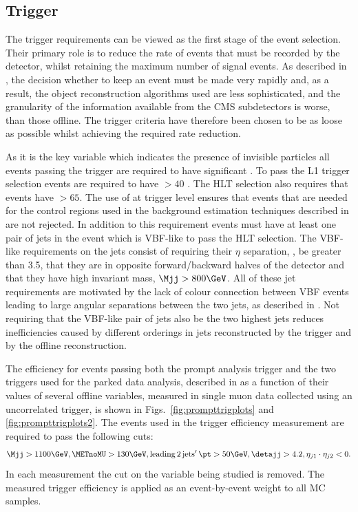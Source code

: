 \subsection{Trigger}
\label{sec:prompttrig}
The trigger requirements can be viewed as the first stage of the event selection. Their primary role is to reduce the rate of events that must be recorded by the detector, whilst retaining the maximum number of signal events. As described in , the decision whether to keep an event must be made very rapidly and, as a result, the object reconstruction algorithms used are less sophisticated, and the granularity of the information available from the CMS subdetectors is worse, than those offline. The trigger criteria have therefore been chosen to be as loose as possible whilst achieving the required rate reduction.

As it is the key variable which indicates the presence of invisible particles all events passing the trigger are required to have significant \MET. To pass the \ac{L1} trigger selection events are required to have \MET$>40$ \GeV. The \ac{HLT} selection also requires that events have \METnoMU$>65$\GeV. The use of \METnoMU at trigger level ensures that events that are needed for the control regions used in the background estimation techniques described in  are not rejected. In addition to this \METnoMU requirement events must have at least one pair of jets in the event which is \ac{VBF}-like to pass the \ac{HLT} selection. The \ac{VBF}-like requirements on the jets consist of requiring their $\eta$ separation, \detajj, be greater than 3.5, that they are in opposite forward/backward halves of the detector and that they have high invariant mass, $\Mjj>800 \GeV$. All of these jet requirements are motivated by the lack of colour connection between \ac{VBF} events leading to large angular separations between the two jets, as described in . Not requiring that the \ac{VBF}-like pair of jets also be the two highest \pt jets reduces inefficiencies caused by different \pt orderings in jets reconstructed by the trigger and by the offline reconstruction.

The efficiency for events passing both the prompt analysis trigger and the two triggers used for the parked data analysis, described in  as a function of their values of several offline variables, measured in single muon data collected using an uncorrelated trigger, is shown in Figs.~\ref{fig:prompttrigplots} and \ref{fig:prompttrigplots2}. The events used in the trigger efficiency measurement are required to pass the following cuts:
\begin{equation}
  \label{eq:prompttrigstudycuts}
  \Mjj>1100 \GeV, \METnoMU>130 \GeV, \mathrm{leading\,2\,jets'\,} \pt>50 \GeV, \detajj>4.2,\eta_{j1}\cdot\eta_{j2}<0.
\end{equation}
In each measurement the cut on the variable being studied is removed. The measured trigger efficiency is applied as an event-by-event weight to all \ac{MC} samples.

